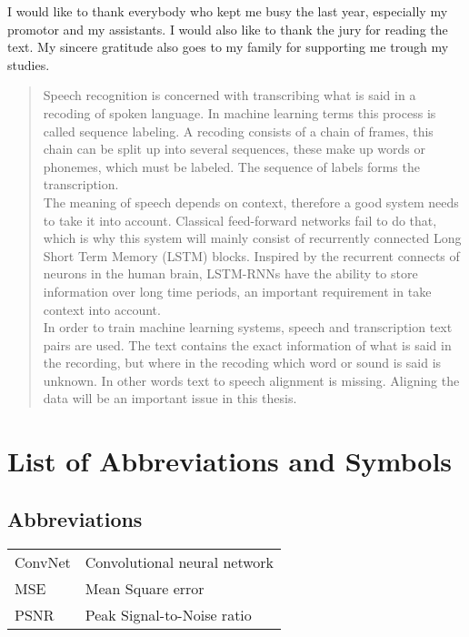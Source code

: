 \documentclass[master=ewit,english]{kulemt}
\begin{document}
\begin{preface}
  I would like to thank everybody who kept me busy the last year,
  especially my promotor and my assistants. I would also like to thank the
  jury for reading the text. My sincere gratitude also goes to my family
  for supporting me trough my studies.
\end{preface}

\tableofcontents*

\begin{abstract}
  Speech recognition is concerned with transcribing what is said in a
  recoding of spoken language. In machine learning terms this process is
  called sequence labeling. A recoding consists of a chain of frames,
  this chain can be split up into several sequences, these make
  up words or phonemes, which must be labeled. The sequence of labels forms
  the transcription. \\
  The meaning of speech depends on context, therefore a good system needs to
  take it into account. Classical feed-forward networks fail to do that, which
  is why this system will mainly consist of recurrently connected Long Short Term
  Memory (LSTM) blocks. Inspired by the recurrent connects of neurons in the human
  brain, LSTM-RNNs have the ability to store information over long time periods,
  an important requirement in take context into account. \\
  In order to train machine learning systems, speech and transcription text
  pairs are used. The text contains the exact information of what is said in
  the recording, but where in the recoding which word or sound is said is unknown.
  In other words text to speech alignment is missing. Aligning the data will be an
  important issue in this thesis.    

\end{abstract}

\listoffiguresandtables
\chapter{List of Abbreviations and Symbols}
\section*{Abbreviations}
\begin{flushleft}
  \renewcommand{\arraystretch}{1.1}
  \begin{tabularx}{\textwidth}{@{}p{12mm}X@{}}
    ConvNet   & Convolutional neural network \\
    MSE   & Mean Square error \\
    PSNR  & Peak Signal-to-Noise ratio \\
  \end{tabularx}
\end{flushleft}
\end{document}

